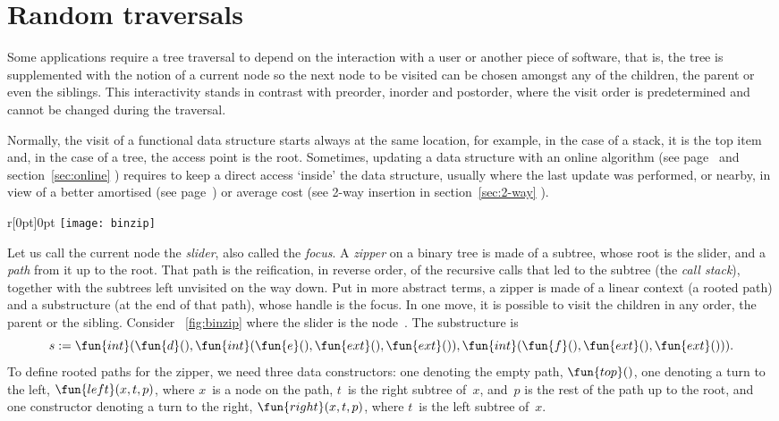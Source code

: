 \section{Random traversals}

Some applications require a tree traversal to depend on the
interaction with a user or another piece of software, that is, the
tree is supplemented with the notion of a current node so the next
node to be visited can be chosen amongst any of the children, the
parent or even the siblings. This interactivity stands in contrast
with preorder, inorder and postorder, where the visit order is
predetermined and cannot be changed during the traversal.

Normally, the visit of a functional data structure starts always at
the same location, for example, in the case of a stack, it is the top
item and, in the case of a tree, the access point is the
root. Sometimes, updating a data structure with an online algorithm
(see page~\pageref{par:online_vs_offline} and section~\ref{sec:online}
) requires to keep a direct access `inside' the
data structure, usually where the last update was performed, or
nearby, in view of a better amortised (see
page~\pageref{par:amortised_cost}) or average cost (see 2-way
insertion in section~\ref{sec:2-way} ).

\begin{wrapfigure}[6]{r}[0pt]{0pt}
\centering
\texttt{[image: binzip]}
\caption{}
\label{fig:binzip}
\end{wrapfigure}
Let us call the current node the \emph{slider}, also called the \emph{focus}. A
\emph{zipper} on a binary tree is made of a
subtree, whose root is the slider, and a \emph{path} from it up to the
root. That path is the reification, in reverse order, of the recursive
calls that led to the subtree (the \emph{call stack}), together with the subtrees left unvisited on
the way down. Put in more abstract terms, a zipper is made of a linear
context (a rooted path) and a substructure (at the end of that path),
whose handle is the focus. In one move, it is possible to visit the
children in any order, the parent or the sibling. Consider
\fig~\ref{fig:binzip} where the slider is the node~. The
substructure is
\begin{equation*}
  s := \fun{int}(\fun{d}(),\fun{int}(\fun{e}(),\fun{ext}(),\fun{ext}()),
       \fun{int}(\fun{f}(),\fun{ext}(),\fun{ext}())).
\end{equation*}
To define rooted paths for the zipper, we need three data
constructors: one denoting the empty path, \(\fun{top}()\), one
denoting a turn to the left, \(\fun{left}(x,t,p)\), where \(x\)~is a
node on the path, \(t\)~is the right subtree of~\(x\), and~\(p\) is
the rest of the path up to the root, and one constructor denoting a
turn to the right, \(\fun{right}(x,t,p)\), where \(t\)~is the left
subtree of~\(x\).

